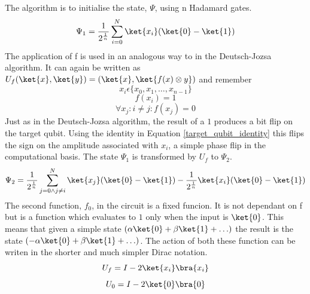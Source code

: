 \documentclass[authoryearcitations]{UoYCSproject}
\begin{document}
The algorithm is to initialise the state, $\Psi$, using n Hadamard gates.
\begin{equation}
\Psi_1=\frac{1}{2^{\frac{1}{n}}}\sum\limits_{i=0}^N \ket{x_i}(\ket{0}-\ket{1})
\end{equation}
The application of f is used in an analogous way to in the Deutsch-Jozsa algorithm.
It can again be written as $U_f(\ket{x},\ket{y})=(\ket{x},\ket{f(x)\otimes{y}})$ and remember
\begin{equation}
x_i\epsilon\{x_0,x_1,\ldots,x_{n-1}\}
\end{equation}
\begin{equation}
f(x_i)=1
\end{equation}
\begin{equation}
\forall{x_j} : i\neq{j} : f(x_j)=0
\end{equation}
Just as in the Deutsch-Jozsa algorithm, the result of a $1$ produces a bit flip on the target qubit.
Using the identity in Equation \ref{target_qubit_identity} this flips the sign on the amplitude associated with $x_i$, a simple phase flip in the computational basis.
The state $\Psi_1$ is transformed by $U_f$ to $\Psi_2$.
\begin{equation}
\Psi_2=\frac{1}{2^{\frac{1}{n}}}\sum\limits_{j=0\wedge{j}\neq{i}}^N \ket{x_j}(\ket{0}-\ket{1}) - \frac{1}{2^{\frac{1}{n}}} \ket{x_i}(\ket{0}-\ket{1})
\end{equation}
The second function, $f_0$, in the circuit is a fixed funcion.
It is not dependant on f but is a function which evaluates to $1$ only when the input is $\ket{0}$.
This means that given a simple state $(\alpha\ket{0}+\beta\ket{1}+\ldots)$ the result is the state $(-\alpha\ket{0}+\beta\ket{1}+\ldots)$.
The action of both these function can be writen in the shorter and much simpler Dirac notation.
\begin{equation}
U_f=I-2\ket{x_i}\bra{x_i}
\end{equation}
\begin{equation}
U_0=I-2\ket{0}\bra{0}
\label{Grover:U_0_dirac}
\end{equation}
\end{document}
